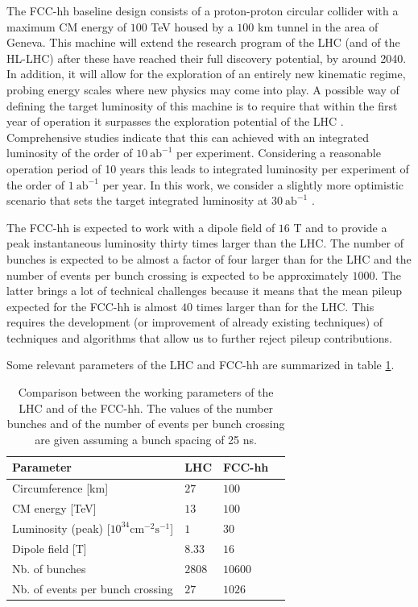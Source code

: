 The FCC-hh baseline design consists of a proton-proton circular collider with a maximum CM energy of $100$ TeV housed by a $100$ km tunnel in the area of Geneva. This machine will extend the research program of the LHC (and of the HL-LHC) after these have reached their full discovery potential, by around 2040. In addition, it will allow for the exploration of an entirely new kinematic regime, probing energy scales where new physics may come into play. A possible way of defining the target luminosity of this machine is to require that within the first year of operation it surpasses the exploration potential of the LHC \cite{FCClumi}. Comprehensive studies \cite{FCCphys,FCClumi} indicate that this can achieved with an integrated luminosity of the order of $10~\text{ab}^{-1}$ per experiment. Considering a reasonable operation period of 10 years this leads to integrated luminosity per experiment of the order of $1~\text{ab}^{-1}$ per year. In this work, we consider a slightly more optimistic scenario that sets the target integrated luminosity at $30~\text{ab}^{-1}$ \cite{hh+jet_100TeV}.

The FCC-hh is expected to work with a dipole field of $16$ T and to provide a peak instantaneous luminosity thirty times larger than the LHC. The number of bunches is expected to be almost a factor of four larger than for the LHC and the number of events per bunch crossing is expected to be approximately $1000$. The latter brings a lot of technical challenges because it means that the mean pileup expected for the FCC-hh is almost $40$ times larger than for the LHC. This requires the development (or improvement of already existing techniques) of techniques and algorithms that allow us to further reject pileup contributions. 

Some relevant parameters of the LHC and FCC-hh are summarized in table \ref{table:FCCpara}.

\renewcommand{\arraystretch}{1.2}

\begin{table}
	\centering
	\caption{Comparison between the working parameters of the LHC and of the FCC-hh. The values of the number bunches and of the number of events per bunch crossing are given assuming a bunch spacing of 25 ns.}
	\begin{tabular}{llll}
		\toprule 
		\textbf{Parameter} & \textbf{LHC} & \textbf{FCC-hh} &  \\
		\midrule
		Circumference [km] & $27$ & $100$ &   \\
		\rowcolor{black!7} CM energy [TeV]  & $13$ & $100$ &  \\
		Luminosity (peak) [$\mathrm{10^{34} cm^{-2} s^{-1}}$] & $1$ & $30$ &   \\
		\rowcolor{black!7} Dipole field [T]  & $8.33$ & $16$  &  \\
		Nb. of bunches & $2808$ & $10600$ &   \\
		\rowcolor{black!7} Nb. of events per bunch crossing  & $27$ & $1026$ &  \\
		\bottomrule
	\end{tabular}
	\label{table:FCCpara}
\end{table}

